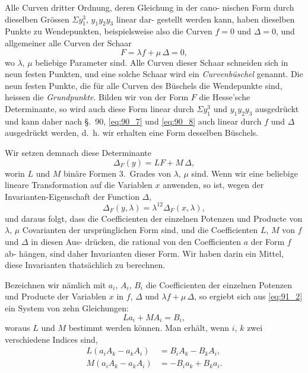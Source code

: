 \documentclass[12pt,a4paper]{article}
\theoremstyle{plain}
\theoremstyle{definition}
\theoremstyle{remark}
\begin{document}
Alle Curven dritter Ordnung, deren Gleichung in der cano-
nischen Form durch dieselben Grössen $\Sigma y_1^3$, $y_1 y_2 y_3$ linear dar-
gestellt werden kann, haben dieselben Punkte zu Wendepunkten,
beispielsweise also die Curven $f=0$ und $\Delta=0$, und allgemeiner
alle Curven der Schaar
\begin{equation}\label{eq:91_1}
F = \lambda f + \mu\, \Delta = 0,
\end{equation}
wo $\lambda$, $\mu$ beliebige Parameter sind. Alle Curven dieser Schaar
schneiden sich in neun festen Punkten, und eine solche Schaar
wird ein \emph{Curvenbüschel} genannt. Die neun festen Punkte, die
für alle Curven des Büschels die Wendepunkte sind, heissen die
\emph{Grundpunkte}. Bilden wir von der Form $F$ die Hesse'sche
Determinante, so wird auch diese Form linear durch $\Sigma y_1^3$ und
$y_1 y_2 y_3$ ausgedrückt und kann daher nach \S.~90, \eqref{eq:90_7} und \eqref{eq:90_8}
auch linear durch $f$ und $\Delta$ ausgedrückt werden, d.~h. wir erhalten
eine Form desselben Büschels.

Wir setzen demnach diese Determinante
\begin{equation}\label{eq:91_2}
\Delta_F(y) = LF + M\,\Delta,
\end{equation}
worin $L$ und $M$ binäre Formen 3.~Grades von $\lambda$, $\mu$ sind.
Wenn wir eine beliebige lineare Transformation auf die
Variablen $x$ anwenden, so ist, wegen der Invarianten-Eigenschaft
der Function $\Delta$,
\begin{equation}\label{eq:91_3}
\Delta_F(y, \lambda) = \lambda^{12} \Delta_{F}(x, \lambda),
\end{equation}
und daraus folgt, dass die Coefficienten der einzelnen Potenzen
und Producte von $\lambda$, $\mu$ Covarianten der ursprünglichen Form
sind, und die Coefficienten $L$, $M$ von $f$ und $\Delta$ in diesen Aus-
drücken, die rational von den Coefficienten $a$ der Form $f$ ab-
hängen, sind daher Invarianten dieser Form. Wir haben darin
ein Mittel, diese Invarianten thatsächlich zu berechnen.

Bezeichnen wir nämlich mit $a_i$, $A_i$, $B_i$ die Coefficienten der
einzelnen Potenzen und Producte der Variablen $x$ in $f$, $\Delta$ und
$\lambda f + \mu\,\Delta$, so ergiebt sich aus \eqref{eq:91_2} ein System von zehn Gleichungen:
\begin{equation*}
L a_i + M A_i = B_i,
\end{equation*}
woraus $L$ und $M$ bestimmt werden können. Man erhält, wenn
$i$, $k$ zwei verschiedene Indices sind,
\begin{equation}\label{eq:91_4}
\begin{aligned}
L(a_i A_k - a_k A_i) &= B_i A_k - B_k A_i, \\
M(a_i A_k - a_k A_i) &= -B_i a_k + B_k a_i.
\end{aligned}
\end{equation}
\end{document}
